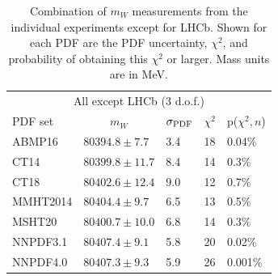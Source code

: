 \begin{table}[!tp]
  \centering  
\begin{tabular}{lllll}
\hline \hline
                            \multicolumn{5}{c}{All except LHCb (3 d.o.f.)} \\
PDF set                   & \multicolumn{1}{c}{$m_W$} & $\sigma_{\scriptsize\textrm{PDF}}$ & $\chi^2$ & p($\chi^2,n$) \\
\hline 
                          ABMP16 & $80394.8 \pm  7.7$ & 3.4 &   18 & 0.04\%  \\
                            CT14 & $80399.8 \pm 11.7$ & 8.4 &   14 & 0.3\% \\
                            CT18 & $80402.6 \pm 12.4$ & 9.0 &   12 & 0.7\% \\
                        MMHT2014 & $80404.4 \pm  9.7$ & 6.5 &   13 & 0.5\% \\
                          MSHT20 & $80400.7 \pm 10.0$ & 6.8 &   14 & 0.3\% \\
                        NNPDF3.1 & $80407.4 \pm  9.1$ & 5.8 &   20 & 0.02\% \\
                        NNPDF4.0 & $80407.3 \pm  9.3$ & 5.9 &   26 & 0.001\% \\
\hline \hline 
\end{tabular}
  \caption{Combination of $m_W$ measurements from the individual experiments except for LHCb.
          Shown for each PDF are the PDF uncertainty, $\chi^2$, and probability of
  obtaining this $\chi^2$ or larger.  Mass units are in MeV.
    \label{tbl:all6_opt2}}
\end{table}

